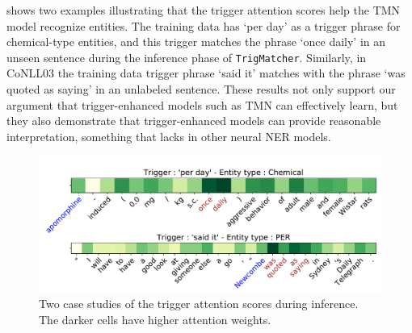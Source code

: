  shows two examples illustrating that the trigger attention scores help the TMN model recognize entities. The training data has `per day' as a trigger phrase for chemical-type entities, and this trigger matches the phrase `once daily' in an unseen sentence during the inference phase of \texttt{TrigMatcher}.
Similarly, in CoNLL03 the training data trigger phrase `said it' matches with the phrase `was quoted as saying' in an unlabeled sentence.
These results not only support our argument that trigger-enhanced models such as TMN can effectively learn, but they also demonstrate that trigger-enhanced models can provide reasonable interpretation, something that lacks in other neural NER models.


\begin{figure}[h]
	\centering 
	\includegraphics[width=0.7\linewidth]{LatexDiss/figures/casestudy.pdf}
	\caption{Two case studies of the trigger attention scores during inference. The darker cells have higher attention weights.} 
	\label{fig:casestudy}
\end{figure}






